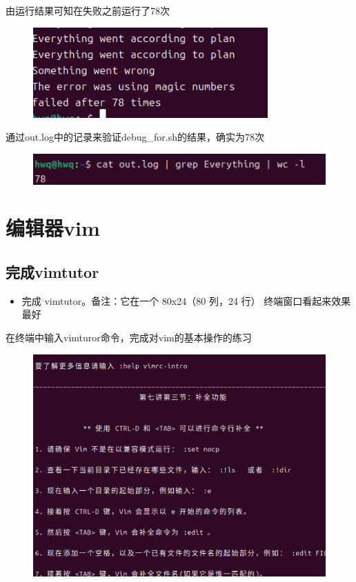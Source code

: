 \documentclass[a4paper, 12pt]{article}
\begin{document}
由运行结果可知在失败之前运行了78次
\begin{figure}[H]
    \centering
    \includegraphics[width=1\linewidth]{shell20.png}
\end{figure}
通过out.log中的记录来验证debug\_for.sh的结果，确实为78次
\begin{figure}[H]
    \centering
    \includegraphics[width=1\linewidth]{shell21.png}
\end{figure}
\section{编辑器vim}
\subsection{完成vimtutor}
\begin{itemize}
    \item 完成 vimtutor。备注：它在一个 80x24（80 列，24 行） 终端窗口看起来效果最好
\end{itemize}
在终端中输入vimturor命令，完成对vim的基本操作的练习
\begin{figure}[H]
    \centering
    \includegraphics[width=1\linewidth]{vim7.png}
\end{figure}
\end{document}
